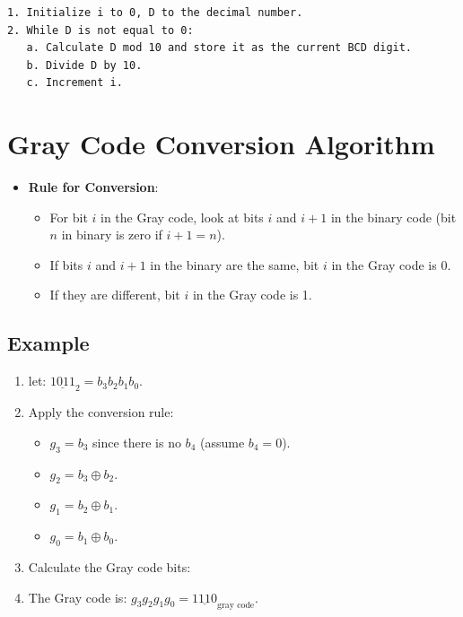 \documentclass[12pt,openany, tikz,border=10pt]{book}
\newcommand*\xor{\oplus}
\begin{document}
\begin{verbatim}
1. Initialize i to 0, D to the decimal number.
2. While D is not equal to 0:
   a. Calculate D mod 10 and store it as the current BCD digit.
   b. Divide D by 10.
   c. Increment i.
\end{verbatim}

\newpage
\section{Gray Code Conversion Algorithm}
\begin{itemize}
    \item[] \textbf{Rule for Conversion}:
    \begin{itemize}
        \item[] For bit \( i \) in the Gray code, look at bits \( i \) and \( i+1 \) in the binary code (bit \( n \) in binary is zero if \( i+1 = n \)).
        \item[] If bits \( i \) and \( i+1 \) in the binary are the same, bit \( i \) in the Gray code is 0.
        \item[] If they are different, bit \( i \) in the Gray code is 1.
    \end{itemize}
\end{itemize}

\subsection{Example}

\begin{enumerate}
    \item[] let: \(\underline{1011}_{2} = b_3b_2b_1b_0 \).
    \item[] Apply the conversion rule:
    \begin{itemize}
        \item[] \( g_3 = b_3 \) since there is no \( b_4 \) (assume \( b_4 = 0 \)).
        \item[] \( g_2 = b_3 \xor b_2 \).
        \item[] \( g_1 = b_2 \xor b_1 \).
        \item[] \( g_0 = b_1 \xor b_0 \).
    \end{itemize}
    \item[] Calculate the Gray code bits:
    \item[] The Gray code is: \( g_3g_2g_1g_0 = \underline{1110}_{\text{gray code}} \).
\end{enumerate}
\end{document}

